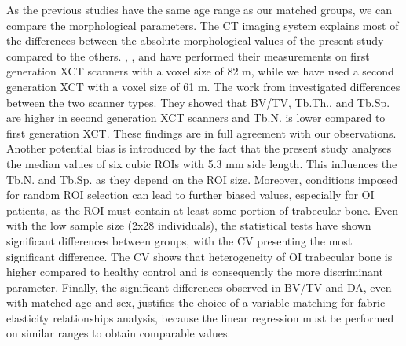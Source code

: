 \documentclass[a4paper,fleqn]{DC_ArtStyle}
\newcommand{\Add}[1]{{\color{blue}{#1}}}
\begin{document}
	As the previous studies \cite{Folkestad2012,Kocijan2015,Rolvien2018} have the same age range as our matched groups, we can compare the morphological parameters. The CT imaging system explains most of the differences between the absolute morphological values of the present study compared to the others. \citeauthor{Folkestad2012}\cite{Folkestad2012}, \citeauthor{Kocijan2015}\cite{Kocijan2015}, and \citeauthor{Rolvien2018}\cite{Rolvien2018} have performed their measurements on first generation XCT scanners with a voxel size of 82 \si{\micro}m, while we have used a second generation XCT with a voxel size of 61 \si{\micro}m. The work from \citeauthor{Agarwal2016}\cite{Agarwal2016} investigated differences between the two scanner types. They showed that BV/TV, Tb.Th., and Tb.Sp. are higher in second generation XCT scanners and Tb.N. is lower compared to first generation XCT. These findings are in full agreement with our observations. Another potential bias is introduced by the fact that the present study analyses the median values of six cubic ROIs with 5.3 mm side length. This influences the Tb.N. and Tb.Sp. as they depend on the ROI size. Moreover, conditions imposed for random ROI selection can lead to further biased values, especially for OI patients, as the ROI must contain at least some portion of trabecular bone. Even with the low sample size (2x28 individuals), the statistical tests have shown significant differences between groups, with the CV presenting the most significant difference. The CV shows that heterogeneity of OI trabecular bone is higher compared to healthy control and is consequently the more discriminant parameter. \Add{In fact, high heterogeneity is found at the edge of void spaces or medullary cavities that are much larger in OI compared to healthy controls.} Finally, the significant differences observed in BV/TV and DA, even with matched age and sex, justifies the choice of a variable matching for fabric-elasticity relationships analysis, because the linear regression must be performed on similar ranges to obtain comparable values. \\
	
\end{document}
